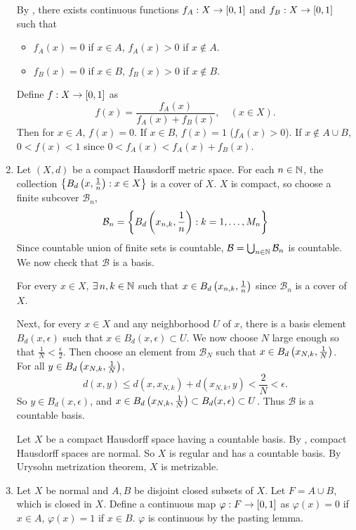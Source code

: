 \documentclass[12pt]{report}
\newcommand{\prob}[1]{\item[\large\textbf{\sffamily #1.}]}
\newcommand{\B}{\mathcal{B}}
\begin{document}
\begin{enumerate}
    \note{\mimpd} By , there exists continuous functions \(f_A : X \rightarrow [0, 1]\) and \(f_B : X \rightarrow [0, 1]\) such that
    \begin{itemize}
        \item \(f_A(x) = 0\) if \(x \in A\), \(f_A(x) > 0\) if \(x \notin A\).
        \item \(f_B(x) = 0\) if \(x \in B\), \(f_B(x) > 0\) if \(x \notin B\).
    \end{itemize}
    Define \(f : X \rightarrow [0, 1]\) as
    \[
        f(x) = \frac{f_A(x)}{f_A(x) + f_B(x)}, \quad (x \in X).
    \]
    Then for \(x \in A\), \(f(x) = 0\). If \(x \in B\), \(f(x) = 1\) (\(f_A(x) > 0\)). If \(x \notin A\cup B\), \(0 < f(x) < 1\) since \(0 < f_A(x) < f_A(x) + f_B(x)\).

    \prob{5} \note{\mimp} Let \((X, d)\) be a compact Hausdorff metric space. For each \(n \in \mathbb{N}\), the collection \(\left\{B_d\left( x, \frac{1}{n} \right) : x \in X\right\}\) is a cover of \(X\). \(X\) is compact, so choose a finite subcover \(\B_n\),
    \[
        \B_n = \left\{B_d\paren{x_{n, k}, \frac{1}{n}} : k = 1, \dots, M_n\right\}
    \]
    Since countable union of finite sets is countable, \(\B = \bigcup_{n \in \N} \B_n\) is countable. We now check that \(\B\) is a basis.

    For every \(x \in X\), \(\exists n, k \in \N\) such that \(x \in B_d\left( x_{n, k}, \frac{1}{n} \right)\) since \(\B_n\) is a cover of \(X\).

    Next, for every \(x \in X\) and any neighborhood \(U\) of \(x\), there is a basis element \(B_d(x, \epsilon)\) such that \(x \in B_d(x, \epsilon) \subset U\). We now choose \(N\) large enough so that \(\frac{1}{N} < \frac{\epsilon}{2}\). Then choose an element from \(\B_N\) such that \(x \in B_d\left( x_{N, k}, \frac{1}{N} \right)\). For all \(y \in B_d\left( x_{N, k}, \frac{1}{N} \right)\),
    \[
        d(x, y) \leq d(x, x_{N, k}) + d(x_{N, k}, y) < \frac{2}{N} < \epsilon.
    \]
    So \(y \in B_d(x, \epsilon)\), and \(x \in B_d\left( x_{N, k}, \frac{1}{N} \right) \subset B_d(x, \epsilon) \subset U\). Thus \(\B\) is a countable basis.

    \note{\mimpd} Let \(X\) be a compact Hausdorff space having a countable basis. By , compact Hausdorff spaces are normal. So \(X\) is regular and has a countable basis. By Urysohn metrization theorem, \(X\) is metrizable.

    \prob{6} Let \(X\) be normal and \(A, B\) be disjoint closed subsets of \(X\). Let \(F = A\cup B\), which is closed in \(X\). Define a continuous map \(\varphi : F \rightarrow [0, 1]\) as \(\varphi(x) = 0\) if \(x \in A\), \(\varphi(x) = 1\) if \(x \in B\). \(\varphi\) is continuous by the pasting lemma.


\end{enumerate}
\end{document}

